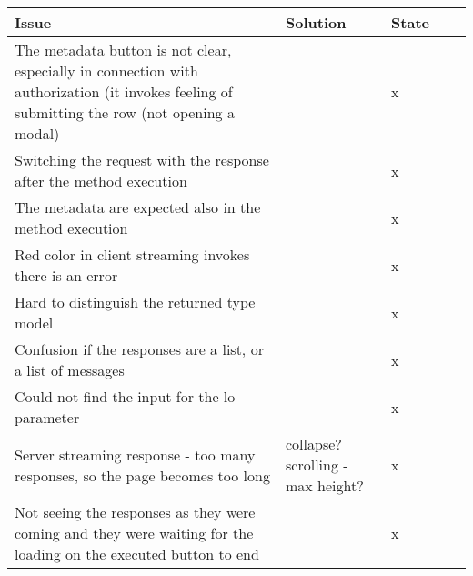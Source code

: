 \begin{table}[hbt!]
    \centering
    \captionsetup{justification=centering}
    \begin{tabular}{|l|l|l|l|l|}
        \hline
        Issue                                                                                                                                         & Solution                          & State \\
        \hline
        The metadata button is not clear, especially in connection with authorization (it invokes feeling of submitting the row (not opening a modal) &          & x     \\
        \hline
        Switching the request with the response after the method execution                                                                            &                                   & x     \\
        \hline
        The metadata are expected also in the method execution                                                                                        &                                   & x     \\
        \hline
        Red color in client streaming invokes there is an error                                                                                       &                                   & x     \\
        \hline
        Hard to distinguish the returned type model                                                                                                   &                                   & x     \\
        \hline
        Confusion if the responses are a list, or a list of messages                                                                                  &                                   & x     \\
        \hline
        Could not find the input for the lo parameter                                                                                                 &                                   & x     \\
        \hline
        Server streaming response - too many responses, so the page becomes too long                                                                  & collapse? scrolling - max height?& x \\
        \hline
        Not seeing the responses as they were coming and they were waiting for the loading on the executed button to end & & x \\

\end{tabular}
\end{table}
